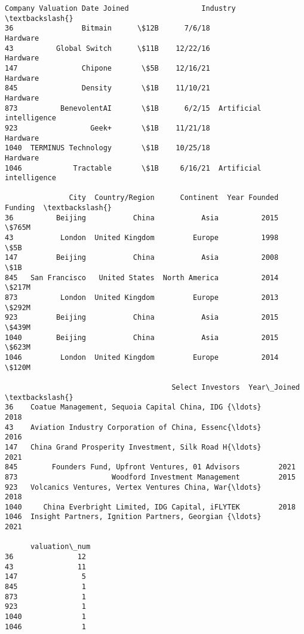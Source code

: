 \documentclass[11pt]{article}
\makeatletter
\newcommand{\boxspacing}{\kern\kvtcb@left@rule\kern\kvtcb@boxsep}
\newcommand{\prompt}[4]{
        \ttfamily\llap{{\color{#2}[#3]:\hspace{3pt}#4}}\vspace{-\baselineskip}
    }
\makeatother
\begin{document}
            \begin{tcolorbox}[breakable, size=fbox, boxrule=.5pt, pad at break*=1mm, opacityfill=0]
\prompt{Out}{outcolor}{19}{\boxspacing}
\begin{Verbatim}[commandchars=\\\{\}]
                  Company Valuation Date Joined                 Industry  \textbackslash{}
36                Bitmain      \$12B      7/6/18                 Hardware
43          Global Switch      \$11B    12/22/16                 Hardware
147               Chipone       \$5B    12/16/21                 Hardware
845               Density       \$1B    11/10/21                 Hardware
873          BenevolentAI       \$1B      6/2/15  Artificial intelligence
923                 Geek+       \$1B    11/21/18                 Hardware
1040  TERMINUS Technology       \$1B    10/25/18                 Hardware
1046            Tractable       \$1B     6/16/21  Artificial intelligence

               City  Country/Region      Continent  Year Founded Funding  \textbackslash{}
36          Beijing           China           Asia          2015   \$765M
43           London  United Kingdom         Europe          1998     \$5B
147         Beijing           China           Asia          2008     \$1B
845   San Francisco   United States  North America          2014   \$217M
873          London  United Kingdom         Europe          2013   \$292M
923         Beijing           China           Asia          2015   \$439M
1040        Beijing           China           Asia          2015   \$623M
1046         London  United Kingdom         Europe          2014   \$120M

                                       Select Investors  Year\_Joined  \textbackslash{}
36    Coatue Management, Sequoia Capital China, IDG {\ldots}         2018
43    Aviation Industry Corporation of China, Essenc{\ldots}         2016
147   China Grand Prosperity Investment, Silk Road H{\ldots}         2021
845        Founders Fund, Upfront Ventures, 01 Advisors         2021
873                      Woodford Investment Management         2015
923   Volcanics Ventures, Vertex Ventures China, War{\ldots}         2018
1040     China Everbright Limited, IDG Capital, iFLYTEK         2018
1046  Insight Partners, Ignition Partners, Georgian {\ldots}         2021

      valuation\_num
36               12
43               11
147               5
845               1
873               1
923               1
1040              1
1046              1
\end{Verbatim}
\end{tcolorbox}
        
\end{document}
